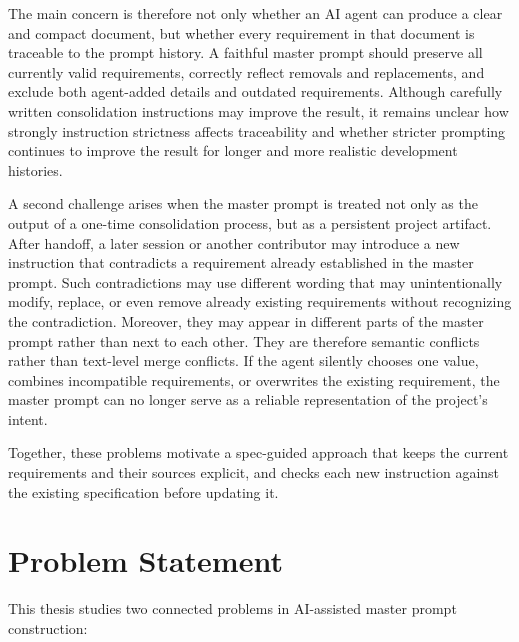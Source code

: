 The main concern is therefore not only whether an AI agent can produce a
clear and compact document, but whether every requirement in that document is
traceable to the prompt history. A faithful master prompt should preserve all
currently valid requirements, correctly reflect removals and replacements, and
exclude both agent-added details and outdated requirements. Although carefully
written consolidation instructions may improve the result, it remains unclear
how strongly instruction strictness affects traceability and whether stricter
prompting continues to improve the result for longer and more realistic
development histories.

A second challenge arises when the master prompt is treated not only as the
output of a one-time consolidation process, but as a persistent project
artifact. After handoff, a later session or another contributor may introduce a
new instruction that contradicts a requirement already established in the
master prompt. Such contradictions may use different wording that may unintentionally
modify, replace, or even remove already existing requirements without recognizing the contradiction.
Moreover, they may appear in different parts of the master prompt rather than next to each
other. They are therefore semantic conflicts rather than text-level merge conflicts.
If the agent silently chooses one value, combines incompatible requirements,
or overwrites the existing requirement, the master prompt can no longer serve
as a reliable representation of the project's intent.

Together, these problems motivate a spec-guided approach that keeps the current requirements
and their sources explicit, and checks each new instruction against the
existing specification before updating it.

\section{Problem Statement}
\label{sec:problem-statement}

This thesis studies two connected problems in AI-assisted master prompt
construction:

